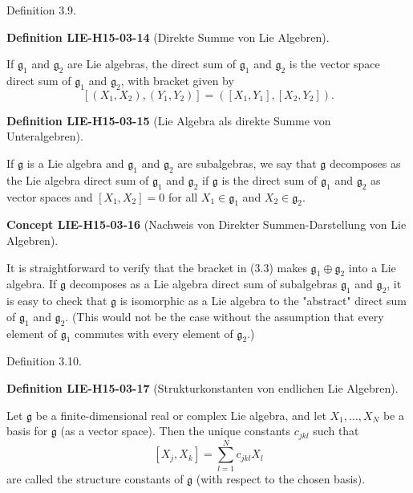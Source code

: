 \documentclass[10pt, letterpaper]{article}
\newcommand{\CustomHeading}[3]{%
  \par\medskip\noindent%
  \textbf{#1 #2} \textnormal{(#3)}.\enskip%
}
\newenvironment{DEF}[2]{\begin{unitbox}\CustomHeading{Definition}{#1}{#2}}{\end{unitbox}}
\newenvironment{CONC}[2]{\begin{unitbox}\CustomHeading{Concept}{#1}{#2}}{\end{unitbox}}
\begin{document}
Definition 3.9. 


\begin{DEF}{LIE-H15-03-14}{Direkte Summe von Lie Algebren}
If $\mathfrak{g}_{1}$ and $\mathfrak{g}_{2}$ are Lie algebras, the direct sum of $\mathfrak{g}_{1}$ and $\mathfrak{g}_{2}$ is the vector space direct sum of $\mathfrak{g}_{1}$ and $\mathfrak{g}_{2}$, with bracket given by
$$
\left[\left(X_{1}, X_{2}\right),\left(Y_{1}, Y_{2}\right)\right]=\left(\left[X_{1}, Y_{1}\right],\left[X_{2}, Y_{2}\right]\right) .
$$
\end{DEF}

\begin{DEF}{LIE-H15-03-15}{Lie Algebra als direkte Summe von Unteralgebren}
If $\mathfrak{g}$ is a Lie algebra and $\mathfrak{g}_{1}$ and $\mathfrak{g}_{2}$ are subalgebras, we say that $\mathfrak{g}$ decomposes as the Lie algebra direct sum of $\mathfrak{g}_{1}$ and $\mathfrak{g}_{2}$ if $\mathfrak{g}$ is the direct sum of $\mathfrak{g}_{1}$ and $\mathfrak{g}_{2}$ as vector spaces and $\left[X_{1}, X_{2}\right]=0$ for all $X_{1} \in \mathfrak{g}_{1}$ and $X_{2} \in \mathfrak{g}_{2}$.
\end{DEF}

\begin{CONC}{LIE-H15-03-16}{Nachweis von Direkter Summen-Darstellung von Lie Algebren}
It is straightforward to verify that the bracket in (3.3) makes $\mathfrak{g}_{1} \oplus \mathfrak{g}_{2}$ into a Lie algebra. If $\mathfrak{g}$ decomposes as a Lie algebra direct sum of subalgebras $\mathfrak{g}_{1}$ and $\mathfrak{g}_{2}$, it is easy to check that $\mathfrak{g}$ is isomorphic as a Lie algebra to the "abstract" direct sum of $\mathfrak{g}_{1}$ and $\mathfrak{g}_{2}$. (This would not be the case without the assumption that every element of $\mathfrak{g}_{1}$ commutes with every element of $\mathfrak{g}_{2}$.)
\end{CONC}

Definition 3.10. 

\begin{DEF}{LIE-H15-03-17}{Strukturkonstanten von endlichen Lie Algebren}
Let $\mathfrak{g}$ be a finite-dimensional real or complex Lie algebra, and let $X_{1}, \ldots, X_{N}$ be a basis for $\mathfrak{g}$ (as a vector space). Then the unique constants $c_{j k l}$ such that
$$
\left[X_{j}, X_{k}\right]=\sum_{l=1}^{N} c_{j k l} X_{l}
$$
are called the structure constants of $\mathfrak{g}$ (with respect to the chosen basis).
\end{DEF}
\end{document}
